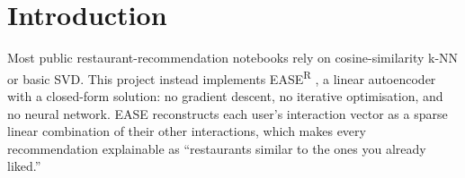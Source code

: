 \section{Introduction}
Most public restaurant-recommendation notebooks rely on cosine-similarity
k-NN or basic SVD. This project instead implements EASE\textsuperscript{R}
\cite{steck2019ease}, a linear autoencoder with a closed-form solution: no
gradient descent, no iterative optimisation, and no neural network. EASE
reconstructs each user's interaction vector as a sparse linear combination
of their other interactions, which makes every recommendation explainable
as ``restaurants similar to the ones you already liked.''
